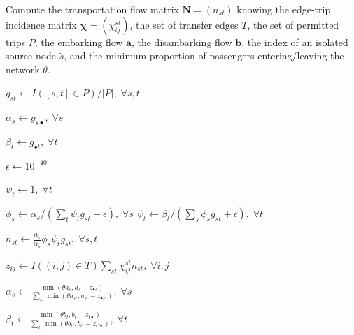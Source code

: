 \documentclass{bmcart}
\begin{document}
\begin{algorithm}[h]
	\caption{Compute the transportation flow matrix $\mathbf{N} = (n_{st})$ knowing the edge-trip incidence matrix $\bm{\chi} = (\chi_{ij}^{st})$, the set of transfer edges $T$, the set of permitted trips $P$, the embarking flow $\mathbf{a}$, the disambarking flow $\mathbf{b}$, the index of an isolated source node $\tilde{s}$, and the minimum proportion of passengers entering/leaving the network $\theta$.}
	\label{algo1}
	\begin{algorithmic}[1]
		\State $g_{st} \leftarrow I([s, t] \in P) / \vert P \vert, \; \forall s,t$ 
		
		\State $\alpha_s \leftarrow g_{s\bullet}, \; \forall s$ 
		
		\State $\beta_t \leftarrow g_{\bullet t}, \; \forall t$ 
		
		\State $\epsilon \leftarrow 10^{-40}$ 
		
		 
		
		\State $\psi_t \leftarrow 1, \; \forall t$
		
		 
		
		\State $\phi_s \leftarrow \alpha_s / (\sum_t \psi_t g_{st} + \epsilon), \; \forall s$
		\State $\psi_t \leftarrow \beta_t / (\sum_s \phi_s g_{st} + \epsilon), \; \forall t$
		
		\EndWhile
		
		\State $n_{st} \leftarrow \frac{a_{\tilde{s}}}{\alpha_{\tilde{s}}} \phi_s \psi_t g_{st}, \; \forall s,t$ 
		
		\State $z_{ij} \leftarrow I((i,j) \in T)\sum_{st} \chi_{ij}^{st} n_{st}, \; \forall i,j$
		
		\State $\alpha_s \leftarrow \frac{\min(\theta a_s, a_s - z_{\bullet s})}{\sum_{s'} \min(\theta a_{s'}, a_{s'} - z_{\bullet {s'}})}, \; \forall s$ 
		
		\State $\beta_t \leftarrow \frac{\min(\theta b_t, b_t - z_{t \bullet})}{\sum_{t'} \min(\theta b_{t'}, b_{t'} - z_{{t'} \bullet})}, \; \forall t$ 
		

\end{algorithmic}
\end{algorithm}
\end{document}
